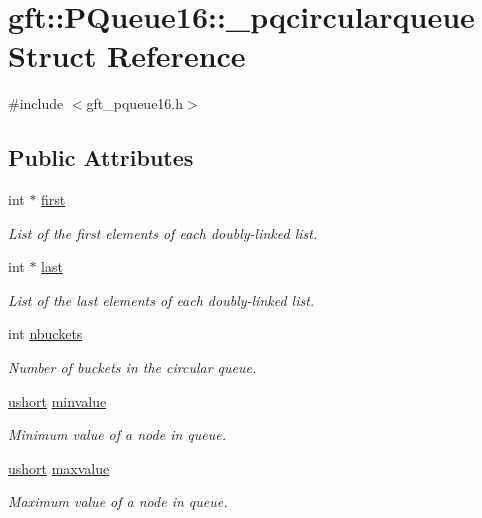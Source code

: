 \hypertarget{structgft_1_1PQueue16_1_1__pqcircularqueue}{}\section{gft\+:\+:P\+Queue16\+:\+:\+\_\+pqcircularqueue Struct Reference}
\label{structgft_1_1PQueue16_1_1__pqcircularqueue}


{\ttfamily \#include $<$gft\+\_\+pqueue16.\+h$>$}

\subsection*{Public Attributes}
\begin{DoxyCompactItemize}
\item 
int $\ast$ \hyperlink{structgft_1_1PQueue16_1_1__pqcircularqueue_aeda855ff236bb30b8269239931656ed7}{first}
\begin{DoxyCompactList}\small\item\em List of the first elements of each doubly-\/linked list. \end{DoxyCompactList}\item 
int $\ast$ \hyperlink{structgft_1_1PQueue16_1_1__pqcircularqueue_a6a74e64858b82a1b274731c5758ba162}{last}
\begin{DoxyCompactList}\small\item\em List of the last elements of each doubly-\/linked list. \end{DoxyCompactList}\item 
int \hyperlink{structgft_1_1PQueue16_1_1__pqcircularqueue_a04b672c1f097742297f79ca45672f248}{nbuckets}
\begin{DoxyCompactList}\small\item\em Number of buckets in the circular queue. \end{DoxyCompactList}\item 
\hyperlink{namespacegft_a878518cf75338c097e2c8e9b10bfb00d}{ushort} \hyperlink{structgft_1_1PQueue16_1_1__pqcircularqueue_a7cceb7dbbae52c61f53e44735ebb8156}{minvalue}
\begin{DoxyCompactList}\small\item\em Minimum value of a node in queue. \end{DoxyCompactList}\item 
\hyperlink{namespacegft_a878518cf75338c097e2c8e9b10bfb00d}{ushort} \hyperlink{structgft_1_1PQueue16_1_1__pqcircularqueue_acc9c8a89ad23c5a641fee6e38a2b7bd9}{maxvalue}
\begin{DoxyCompactList}\small\item\em Maximum value of a node in queue. \end{DoxyCompactList}\end{DoxyCompactItemize}


